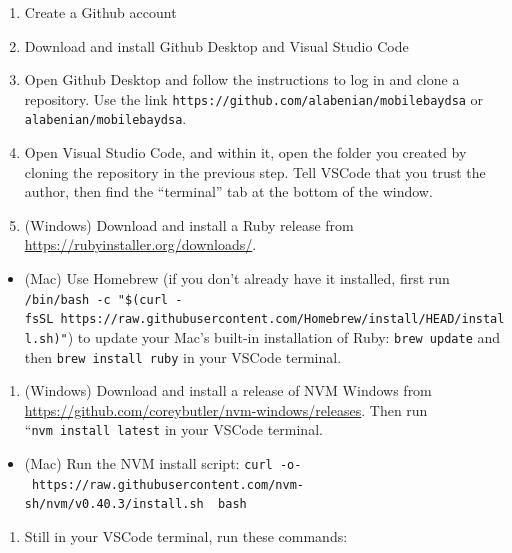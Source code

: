 \documentclass[
]{book}
\providecommand{\tightlist}{%
  \setlength{\itemsep}{0pt}\setlength{\parskip}{0pt}}
\begin{document}
\begin{enumerate}
\def\labelenumi{\arabic{enumi}.}
\tightlist
\item
  Create a Github account
\item
  Download and install Github Desktop and Visual Studio Code
\item
  Open Github Desktop and follow the instructions to log in and clone a repository. Use the link \texttt{https://github.com/alabenian/mobilebaydsa} or \texttt{alabenian/mobilebaydsa}.
\item
  Open Visual Studio Code, and within it, open the folder you created by cloning the repository in the previous step. Tell VSCode that you trust the author, then find the ``terminal'' tab at the bottom of the window.
\item
  (Windows) Download and install a Ruby release from \url{https://rubyinstaller.org/downloads/}.
\end{enumerate}

\begin{itemize}
\tightlist
\item
  (Mac) Use Homebrew (if you don't already have it installed, first run \texttt{/bin/bash\ -c\ "\$(curl\ -fsSL\ https://raw.githubusercontent.com/Homebrew/install/HEAD/install.sh)"}) to update your Mac's built-in installation of Ruby: \texttt{brew\ update} and then \texttt{brew\ install\ ruby} in your VSCode terminal.
\end{itemize}

\begin{enumerate}
\def\labelenumi{\arabic{enumi}.}
\setcounter{enumi}{5}
\tightlist
\item
  (Windows) Download and install a release of NVM Windows from \url{https://github.com/coreybutler/nvm-windows/releases}. Then run ``\texttt{nvm\ install\ latest} in your VSCode terminal.
\end{enumerate}

\begin{itemize}
\tightlist
\item
  (Mac) Run the NVM install script: \texttt{curl\ -o-\ https://raw.githubusercontent.com/nvm-sh/nvm/v0.40.3/install.sh\ \textbar{}\ bash}
\end{itemize}

\begin{enumerate}
\def\labelenumi{\arabic{enumi}.}
\setcounter{enumi}{6}
\tightlist
\item
  Still in your VSCode terminal, run these commands:
\end{enumerate}
\end{document}
